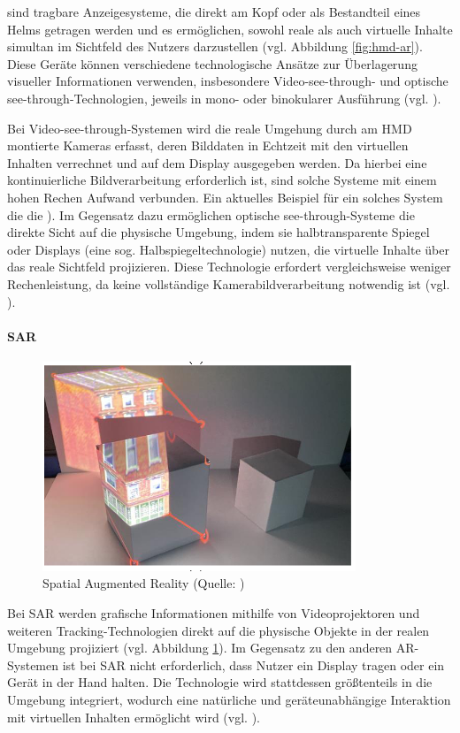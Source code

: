 sind tragbare Anzeigesysteme, die direkt am Kopf oder als Bestandteil eines Helms getragen werden und es ermöglichen, sowohl reale als auch virtuelle Inhalte simultan im Sichtfeld des Nutzers darzustellen (vgl. Abbildung \ref{fig:hmd-ar}). Diese Geräte können verschiedene technologische Ansätze zur Überlagerung visueller Informationen verwenden, insbesondere Video-see-through- und optische see-through-Technologien, jeweils in mono- oder binokularer Ausführung (vgl. \citealp[S. 346]{carmigniani_augmented_2011}).

Bei Video-see-through-Systemen wird die reale Umgehung durch am \ac{HMD} montierte Kameras erfasst, deren Bilddaten in Echtzeit mit den virtuellen Inhalten verrechnet und auf dem Display ausgegeben werden. Da hierbei eine kontinuierliche Bildverarbeitung erforderlich ist, sind solche Systeme mit einem hohen Rechen
Aufwand verbunden. Ein aktuelles Beispiel für ein solches System die die \cite{htc_vive_2023}). Im Gegensatz dazu ermöglichen optische see-through-Systeme die direkte Sicht auf die physische Umgebung, indem sie halbtransparente Spiegel oder Displays (eine sog. Halbspiegeltechnologie) nutzen, die virtuelle Inhalte über das reale Sichtfeld projizieren. Diese Technologie erfordert vergleichsweise weniger Rechenleistung, da keine vollständige Kamerabildverarbeitung notwendig ist (vgl. \citealp[S. 346f]{carmigniani_augmented_2011}).

\paragraph{\ac{SAR}}
\begin{figure}[ht]
\centering
\includegraphics[width=0.5\linewidth]{content/pictures/spatial-ar.PNG}
\caption{Spatial Augmented Reality (Quelle: \citealp[S. 7]{jin_bim-based_2020})}
\label{fig:spatial-ar}
\end{figure}

Bei \ac{SAR} werden grafische Informationen mithilfe von Videoprojektoren und weiteren Tracking-Technologien direkt auf die physische Objekte in der realen Umgebung projiziert (vgl. Abbildung \ref{fig:spatial-ar}). Im Gegensatz zu den anderen \ac{AR}-Systemen ist bei \ac{SAR} nicht erforderlich, dass Nutzer ein Display tragen oder ein Gerät in der Hand halten. Die Technologie wird stattdessen größtenteils in die Umgebung integriert, wodurch eine natürliche und geräteunabhängige Interaktion mit virtuellen Inhalten ermöglicht wird (vgl. \citealp[S. 348]{carmigniani_augmented_2011}).

